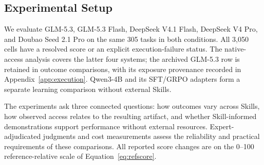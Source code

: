 \subsection{Experimental Setup}
We evaluate GLM-5.3, GLM-5.3 Flash, DeepSeek V4.1 Flash, DeepSeek V4 Pro,
and Doubao Seed 2.1 Pro on the same 305 tasks in both conditions. All 3,050
cells have a resolved score or an explicit execution-failure status. The
native-access analysis covers the latter four systems; the archived GLM-5.3
row is retained in outcome comparisons, with its exposure provenance recorded
in Appendix~\ref{app:execution}. Qwen3-4B and its SFT/GRPO adapters form a
separate learning comparison without external Skills.

The experiments ask three connected questions: how outcomes vary across
Skills, how observed access relates to the resulting artifact, and whether
Skill-informed demonstrations support performance without external resources.
Expert-adjudicated judgments and cost measurements assess the reliability
and practical requirements of these comparisons. All reported score changes
are on the 0--100 reference-relative scale of Equation~\ref{eq:refscore}.
